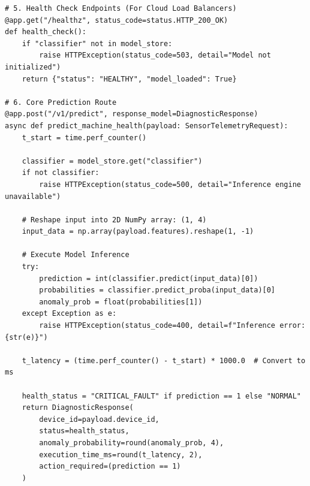 \begin{lstlisting}[style=pythonstyle, caption={Complete FastAPI model serving application with Pydantic validation.}, label={lst:fastapi_server}]
# 5. Health Check Endpoints (For Cloud Load Balancers)
@app.get("/healthz", status_code=status.HTTP_200_OK)
def health_check():
    if "classifier" not in model_store:
        raise HTTPException(status_code=503, detail="Model not initialized")
    return {"status": "HEALTHY", "model_loaded": True}

# 6. Core Prediction Route
@app.post("/v1/predict", response_model=DiagnosticResponse)
async def predict_machine_health(payload: SensorTelemetryRequest):
    t_start = time.perf_counter()
    
    classifier = model_store.get("classifier")
    if not classifier:
        raise HTTPException(status_code=500, detail="Inference engine unavailable")
    
    # Reshape input into 2D NumPy array: (1, 4)
    input_data = np.array(payload.features).reshape(1, -1)
    
    # Execute Model Inference
    try:
        prediction = int(classifier.predict(input_data)[0])
        probabilities = classifier.predict_proba(input_data)[0]
        anomaly_prob = float(probabilities[1])
    except Exception as e:
        raise HTTPException(status_code=400, detail=f"Inference error: {str(e)}")
        
    t_latency = (time.perf_counter() - t_start) * 1000.0  # Convert to ms
    
    health_status = "CRITICAL_FAULT" if prediction == 1 else "NORMAL"
    return DiagnosticResponse(
        device_id=payload.device_id,
        status=health_status,
        anomaly_probability=round(anomaly_prob, 4),
        execution_time_ms=round(t_latency, 2),
        action_required=(prediction == 1)
    )
\end{lstlisting}


